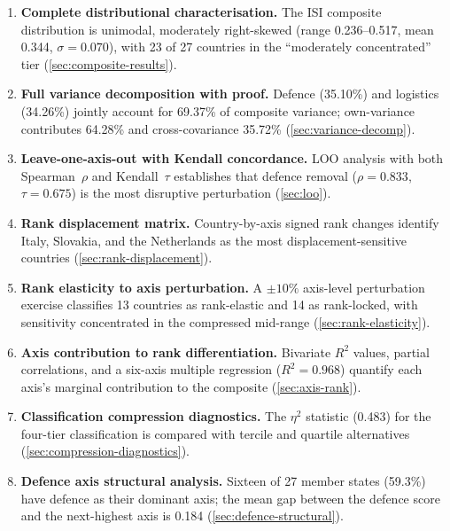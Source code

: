 \begin{enumerate}[leftmargin=2em]
  \item \textbf{Complete distributional characterisation.}
    The ISI composite distribution is unimodal, moderately
    right-skewed (range 0.236--0.517, mean 0.344, $\sigma = 0.070$),
    with 23 of 27 countries in the ``moderately concentrated'' tier
    (\cref{sec:composite-results}).

  \item \textbf{Full variance decomposition with proof.}
    Defence (35.10\%) and logistics (34.26\%) jointly account for
    69.37\% of composite variance; own-variance contributes 64.28\%
    and cross-covariance 35.72\% (\cref{sec:variance-decomp}).

  \item \textbf{Leave-one-axis-out with Kendall concordance.}
    LOO analysis with both Spearman~$\rho$ and Kendall~$\tau$
    establishes that defence removal ($\rho = 0.833$, $\tau = 0.675$)
    is the most disruptive perturbation (\cref{sec:loo}).

  \item \textbf{Rank displacement matrix.}
    Country-by-axis signed rank changes identify Italy, Slovakia, and
    the Netherlands as the most displacement-sensitive countries
    (\cref{sec:rank-displacement}).

  \item \textbf{Rank elasticity to axis perturbation.}
    A $\pm 10\%$ axis-level perturbation exercise classifies 13
    countries as rank-elastic and 14 as rank-locked, with sensitivity
    concentrated in the compressed mid-range (\cref{sec:rank-elasticity}).

  \item \textbf{Axis contribution to rank differentiation.}
    Bivariate $R^2$ values, partial correlations, and a six-axis
    multiple regression ($R^2 = 0.968$) quantify each axis's marginal
    contribution to the composite (\cref{sec:axis-rank}).

  \item \textbf{Classification compression diagnostics.}
    The $\eta^2$ statistic (0.483) for the four-tier classification
    is compared with tercile and quartile alternatives
    (\cref{sec:compression-diagnostics}).

  \item \textbf{Defence axis structural analysis.}
    Sixteen of 27 member states (59.3\%) have defence as their
    dominant axis; the mean gap between the defence score and the
    next-highest axis is 0.184 (\cref{sec:defence-structural}).


\end{enumerate}
